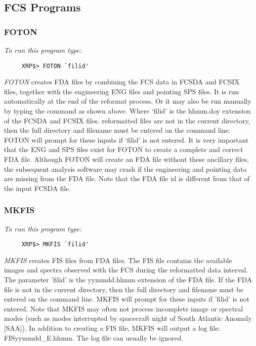 \subsection{FCS Programs}

\subsubsection{FOTON}

{\em To run this program type:}
\begin{verbatim}
     XRP$> FOTON `filid'
\end{verbatim}
{\em FOTON} creates FDA files by combining the FCS data in FCSDA and FCSIX files,
together with the engineering ENG files and pointing SPS files. It is run
automatically at the end of the reformat process. Or it may also be run manually
by typing the command as shown above.
Where `filid' is the hhmm.doy extension of the FCSDA and FCSIX files.
reformatted files are not in the current directory, then the full directory and
filename must be entered on the command line. FOTON will prompt for these
inputs if `filid' is not entered.  It is very important that the ENG and SPS
files exist for FOTON to create a complete and correct FDA file.  Although
FOTON will create an FDA  file without these ancillary files, the subsequent
analysis software may  crash if the engineering and pointing data are missing
from the FDA file. Note that the FDA file id is different from that of the
input FCSDA file.

\subsubsection{MKFIS}

{\em To run this program type:}
\begin{verbatim}
     XRP$> MKFIS `filid'
\end{verbatim}
{\em MKFIS} creates FIS files from FDA files.  The FIS file contains  the
available images and spectra observed with the  FCS during the reformatted data
interval.  The parameter 'filid' is the yymmdd.hhmm extension of  the FDA file.
If the FDA file is not in the current directory, then the full  directory and
filename must be entered on the command line. MKFIS will prompt  for these
inputs if 'filid' is not entered. Note that MKFIS may often not  process
incomplete image or spectral modes (such as modes interrupted by  spacecraft
night of South Atlantic Anomaly [SAA]). In addition to creating a FIS  file,
MKFIS will output a log file: FISyymmdd\_E.hhmm. The log file can usually  be
ignored.

